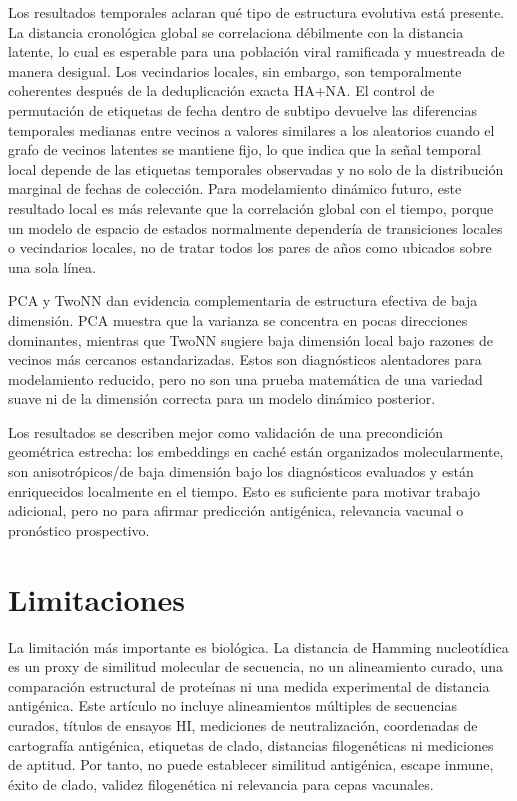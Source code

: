 \documentclass[11pt]{article}
\begin{document}
Los resultados temporales aclaran qué tipo de estructura evolutiva está presente. La distancia cronológica global se correlaciona débilmente con la distancia latente, lo cual es esperable para una población viral ramificada y muestreada de manera desigual. Los vecindarios locales, sin embargo, son temporalmente coherentes después de la deduplicación exacta HA+NA. El control de permutación de etiquetas de fecha dentro de subtipo devuelve las diferencias temporales medianas entre vecinos a valores similares a los aleatorios cuando el grafo de vecinos latentes se mantiene fijo, lo que indica que la señal temporal local depende de las etiquetas temporales observadas y no solo de la distribución marginal de fechas de colección. Para modelamiento dinámico futuro, este resultado local es más relevante que la correlación global con el tiempo, porque un modelo de espacio de estados normalmente dependería de transiciones locales o vecindarios locales, no de tratar todos los pares de años como ubicados sobre una sola línea.

PCA y TwoNN dan evidencia complementaria de estructura efectiva de baja dimensión. PCA muestra que la varianza se concentra en pocas direcciones dominantes, mientras que TwoNN sugiere baja dimensión local bajo razones de vecinos más cercanos estandarizadas. Estos son diagnósticos alentadores para modelamiento reducido, pero no son una prueba matemática de una variedad suave ni de la dimensión correcta para un modelo dinámico posterior.

Los resultados se describen mejor como validación de una precondición geométrica estrecha: los embeddings en caché están organizados molecularmente, son anisotrópicos/de baja dimensión bajo los diagnósticos evaluados y están enriquecidos localmente en el tiempo. Esto es suficiente para motivar trabajo adicional, pero no para afirmar predicción antigénica, relevancia vacunal o pronóstico prospectivo.

\section{Limitaciones}

La limitación más importante es biológica. La distancia de Hamming nucleotídica es un proxy de similitud molecular de secuencia, no un alineamiento curado, una comparación estructural de proteínas ni una medida experimental de distancia antigénica. Este artículo no incluye alineamientos múltiples de secuencias curados, títulos de ensayos HI, mediciones de neutralización, coordenadas de cartografía antigénica, etiquetas de clado, distancias filogenéticas ni mediciones de aptitud. Por tanto, no puede establecer similitud antigénica, escape inmune, éxito de clado, validez filogenética ni relevancia para cepas vacunales.
\end{document}
